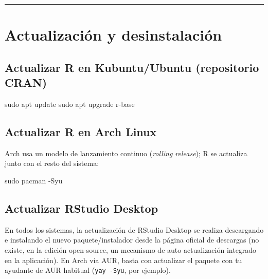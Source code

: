 \documentclass[
  man,
  floatsintext,
  longtable,
  a4paper,
  nolmodern,
  notxfonts,
  notimes,
  12pt,
  colorlinks=true,linkcolor=blue,citecolor=blue,urlcolor=blue]{apa7}
\newenvironment{Shaded}{\begin{snugshade}}{\end{snugshade}}
\newcommand{\AttributeTok}[1]{\textcolor[rgb]{0.40,0.45,0.13}{#1}}
\newcommand{\FunctionTok}[1]{\textcolor[rgb]{0.28,0.35,0.67}{#1}}
\newcommand{\NormalTok}[1]{\textcolor[rgb]{0.00,0.23,0.31}{#1}}
\begin{document}
\begin{center}\rule{0.5\linewidth}{0.5pt}\end{center}

\section{Actualización y
desinstalación}\label{actualizaciuxf3n-y-desinstalaciuxf3n}

\subsection{Actualizar R en Kubuntu/Ubuntu (repositorio
CRAN)}\label{actualizar-r-en-kubuntuubuntu-repositorio-cran}

\begin{Shaded}
\begin{Highlighting}[]
\FunctionTok{sudo}\NormalTok{ apt update}
\FunctionTok{sudo}\NormalTok{ apt upgrade r{-}base}
\end{Highlighting}
\end{Shaded}

\subsection{Actualizar R en Arch
Linux}\label{actualizar-r-en-arch-linux}

Arch usa un modelo de lanzamiento continuo (\emph{rolling release}); R
se actualiza junto con el resto del sistema:

\begin{Shaded}
\begin{Highlighting}[]
\FunctionTok{sudo}\NormalTok{ pacman }\AttributeTok{{-}Syu}
\end{Highlighting}
\end{Shaded}

\subsection{Actualizar RStudio
Desktop}\label{actualizar-rstudio-desktop}

En todos los sistemas, la actualización de RStudio Desktop se realiza
descargando e instalando el nuevo paquete/instalador desde la página
oficial de descargas (no existe, en la edición open-source, un mecanismo
de auto-actualización integrado en la aplicación). En Arch vía AUR,
basta con actualizar el paquete con tu ayudante de AUR habitual
(\texttt{yay\ -Syu}, por ejemplo).
\end{document}
